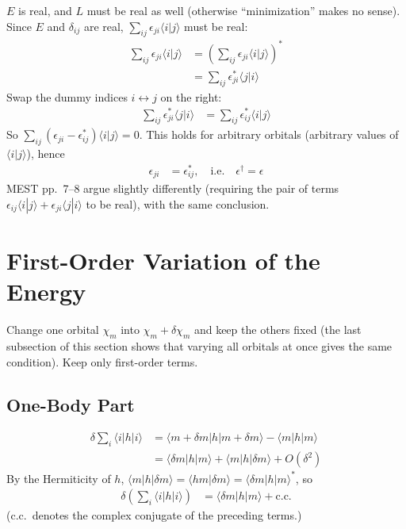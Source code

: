 $E$ is real, and $L$ must be real as well (otherwise ``minimization'' makes no sense). Since $E$ and $\delta_{ij}$ are real, $\sum_{ij} \epsilon_{ji} \langle i|j\rangle$ must be real:
\begin{align*}
\sum_{ij} \epsilon_{ji} \langle i|j\rangle &= \left( \sum_{ij} \epsilon_{ji} \langle i|j\rangle \right)^* \\
&= \sum_{ij} \epsilon_{ji}^* \langle j|i\rangle
\end{align*}
Swap the dummy indices $i \leftrightarrow j$ on the right:
\begin{align*}
\sum_{ij} \epsilon_{ji}^* \langle j|i\rangle &= \sum_{ij} \epsilon_{ij}^* \langle i|j\rangle
\end{align*}
So $\sum_{ij} (\epsilon_{ji} - \epsilon_{ij}^*) \langle i|j\rangle = 0$. This holds for arbitrary orbitals (arbitrary values of $\langle i | j \rangle$), hence
\begin{align*}
\epsilon_{ji} &= \epsilon_{ij}^*, \quad \text{i.e.} \quad \epsilon^\dagger = \epsilon
\end{align*}
MEST pp.~7--8 argue slightly differently (requiring the pair of terms $\epsilon_{ij} \langle i|j\rangle + \epsilon_{ji} \langle j|i\rangle$ to be real), with the same conclusion.

\section{First-Order Variation of the Energy}

Change one orbital $\chi_m$ into $\chi_m + \delta \chi_m$ and keep the others fixed (the last subsection of this section shows that varying all orbitals at once gives the same condition). Keep only first-order terms.

\subsection{One-Body Part}

\begin{align*}
\delta \sum_i \langle i|h|i\rangle &= \langle m + \delta m|h|m + \delta m\rangle - \langle m|h|m\rangle \\
&= \langle \delta m|h|m\rangle + \langle m|h|\delta m\rangle + O(\delta^2)
\end{align*}
By the Hermiticity of $h$, $\langle m|h|\delta m\rangle = \langle h m|\delta m\rangle = \langle \delta m|h|m\rangle^*$, so
\begin{align*}
\delta \left( \sum_i \langle i|h|i\rangle \right) &= \langle \delta m|h|m\rangle + \text{c.c.}
\end{align*}
(c.c.\ denotes the complex conjugate of the preceding terms.)

